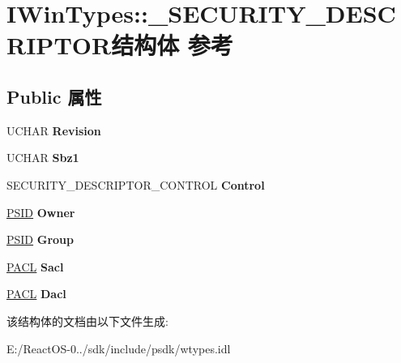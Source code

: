 \hypertarget{struct_i_win_types_1_1___s_e_c_u_r_i_t_y___d_e_s_c_r_i_p_t_o_r}{}\section{I\+Win\+Types\+:\+:\+\_\+\+S\+E\+C\+U\+R\+I\+T\+Y\+\_\+\+D\+E\+S\+C\+R\+I\+P\+T\+O\+R结构体 参考}
\label{struct_i_win_types_1_1___s_e_c_u_r_i_t_y___d_e_s_c_r_i_p_t_o_r}
\subsection*{Public 属性}
\begin{DoxyCompactItemize}
\item 
\mbox{\label{struct_i_win_types_1_1___s_e_c_u_r_i_t_y___d_e_s_c_r_i_p_t_o_r_aaa0d7f7bed04fb073a73183ae96e7363}} 
U\+C\+H\+AR {\bfseries Revision}
\item 
\mbox{\label{struct_i_win_types_1_1___s_e_c_u_r_i_t_y___d_e_s_c_r_i_p_t_o_r_a1173c69e08fd0e01ef6c3429ff28d61c}} 
U\+C\+H\+AR {\bfseries Sbz1}
\item 
\mbox{\label{struct_i_win_types_1_1___s_e_c_u_r_i_t_y___d_e_s_c_r_i_p_t_o_r_a286296602977b896baa9eb85ba3409ac}} 
S\+E\+C\+U\+R\+I\+T\+Y\+\_\+\+D\+E\+S\+C\+R\+I\+P\+T\+O\+R\+\_\+\+C\+O\+N\+T\+R\+OL {\bfseries Control}
\item 
\mbox{\label{struct_i_win_types_1_1___s_e_c_u_r_i_t_y___d_e_s_c_r_i_p_t_o_r_a7f6b8e77777b3cb11a3fa59abb80c4f7}} 
\hyperlink{struct_i_win_types_1_1___s_i_d}{P\+S\+ID} {\bfseries Owner}
\item 
\mbox{\label{struct_i_win_types_1_1___s_e_c_u_r_i_t_y___d_e_s_c_r_i_p_t_o_r_a347e8abfb490d0a7b6e9f59c1676cad8}} 
\hyperlink{struct_i_win_types_1_1___s_i_d}{P\+S\+ID} {\bfseries Group}
\item 
\mbox{\label{struct_i_win_types_1_1___s_e_c_u_r_i_t_y___d_e_s_c_r_i_p_t_o_r_a6d9fe199aff5bf51cf7bcaa3d305f1c0}} 
\hyperlink{struct_i_win_types_1_1___a_c_l}{P\+A\+CL} {\bfseries Sacl}
\item 
\mbox{\label{struct_i_win_types_1_1___s_e_c_u_r_i_t_y___d_e_s_c_r_i_p_t_o_r_a88b52274aee85916f4adf474b70d7c60}} 
\hyperlink{struct_i_win_types_1_1___a_c_l}{P\+A\+CL} {\bfseries Dacl}
\end{DoxyCompactItemize}


该结构体的文档由以下文件生成\+:\begin{DoxyCompactItemize}
\item 
E\+:/\+React\+O\+S-\/0../sdk/include/psdk/wtypes.\+idl\end{DoxyCompactItemize}
